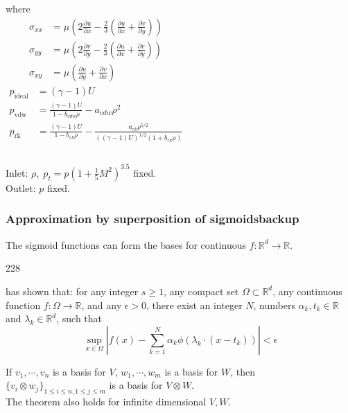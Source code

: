 \documentclass{beamer}
\let\oldcite=\cite
\renewcommand{\cite}[1]{\textcolor[rgb]{.4,.4,.85}{\oldcite{#1}}}
\newcommand{\barrow}{\item[\color{darkred}\ding{228}]}
\begin{document}
\begin{frame}
    \begin{columns}
        where
        \begin{equation*}\begin{split}
            \sigma_{xx} &= \mu \left(2 \frac{\partial u}{\partial x} - \frac{2}{3} \left(\frac{\partial u}{\partial x} 
            + \frac{\partial v}{\partial y}\right)\right)\\
            \sigma_{yy} &= \mu \left(2 \frac{\partial v}{\partial y} - \frac{2}{3} \left(\frac{\partial u}{\partial x} 
            + \frac{\partial v}{\partial y}\right)\right)\\
            \sigma_{xy}&=\mu\left(\frac{\partial u}{\partial y} + \frac{\partial v}{\partial x}\right)
        \end{split}\end{equation*}
        \begin{equation*}\begin{split}
            p_{\textrm{ideal}} &= (\gamma-1) U\\
            p_{\textrm{vdw}} &= \frac{(\gamma-1)U}{1-b_{vdw}\rho} - a_{vdw}\rho^2\\
            p_{\textrm{rk}} &= \frac{(\gamma-1)U}{1-b_{rk}\rho} - 
            \frac{a_{rk}\rho^{5/2}}{((\gamma-1)U)^{1/2}(1+b_{rk}\rho)}
        \end{split}\label{NS state equations}
        \end{equation*}
    \end{columns}
    \vspace{.2cm}
    Inlet: $\rho, \; p_t=p\left(1+\frac{1}{5} M^2\right)^{3.5}$ fixed.\\
    Outlet: $p$ fixed.
\end{frame}

\begin{frame}
    \frametitle{Approximation by superposition of sigmoids\hfill \scriptsize{backup}} \small
    The sigmoid functions can form the bases for continuous $f:\mathbb{R}^d\rightarrow \mathbb{R}$.\vspace{1cm}
    \begin{dinglist}{228}
        \barrow \cite{Mhaskar 92} has shown that: for any integer $s\ge 1$, any compact
        set $\Omega\subset\mathbb{R}^d$, any continuous function $f: \Omega\rightarrow \mathbb{R}$,
        and any $\epsilon>0$, there exist an integer $N$, numbers $\alpha_k, t_k\in \mathbb{R}$ and
        $\lambda_k\in \mathbb{R}^d$, such that
        $$
            \sup_{x\in\Omega} \left| f(x) - \sum_{k=1}^N \alpha_k\phi(\lambda_k\cdot (x-t_k))\right|
            < \epsilon
        $$
        \barrow If $v_1, \cdots, v_n$ is a basis for $V$, $w_1, \cdots, w_m$ is a basis for $W$, then
        $\{v_i\otimes w_j\}_{1\le i\le n, 1\le j\le m}$ is a basis for $V\otimes W$.\\
        The theorem also holds for infinite dimensional $V, W$.
    \end{dinglist}
\end{frame}
\end{document}
